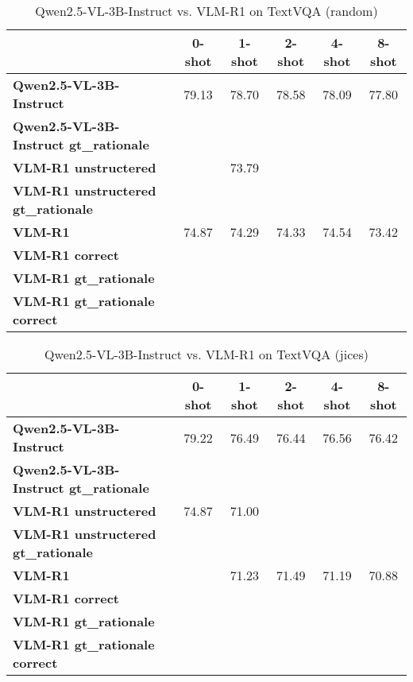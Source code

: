 \begin{table}
\caption{Qwen2.5-VL-3B-Instruct vs. VLM-R1 on TextVQA (random)}
\label{tab:Qwen2.5-VL-3B-Instruct_TextVQA_TRAIN_random}
\begin{tabular}{lccccc}
\toprule
 & 0-shot & 1-shot & 2-shot & 4-shot & 8-shot \\
\midrule
\textbf{Qwen2.5-VL-3B-Instruct} & 79.13 & 78.70 & 78.58 & 78.09 & 77.80 \\
\textbf{Qwen2.5-VL-3B-Instruct gt\_rationale} &  &  &  &  &  \\
\textbf{VLM-R1 unstructered} &  & 73.79 &  &  &  \\
\textbf{VLM-R1 unstructered gt\_rationale} &  &  &  &  &  \\
\textbf{VLM-R1} & 74.87 & 74.29 & 74.33 & 74.54 & 73.42 \\
\textbf{VLM-R1 correct} &  &  &  &  &  \\
\textbf{VLM-R1 gt\_rationale} &  &  &  &  &  \\
\textbf{VLM-R1 gt\_rationale correct} &  &  &  &  &  \\
\bottomrule
\end{tabular}
\end{table}


\begin{table}
\caption{Qwen2.5-VL-3B-Instruct vs. VLM-R1 on TextVQA (jices)}
\label{tab:Qwen2.5-VL-3B-Instruct_TextVQA_TRAIN_jices}
\begin{tabular}{lccccc}
\toprule
 & 0-shot & 1-shot & 2-shot & 4-shot & 8-shot \\
\midrule
\textbf{Qwen2.5-VL-3B-Instruct} & 79.22 & 76.49 & 76.44 & 76.56 & 76.42 \\
\textbf{Qwen2.5-VL-3B-Instruct gt\_rationale} &  &  &  &  &  \\
\textbf{VLM-R1 unstructered} & 74.87 & 71.00 &  &  &  \\
\textbf{VLM-R1 unstructered gt\_rationale} &  &  &  &  &  \\
\textbf{VLM-R1} &  & 71.23 & 71.49 & 71.19 & 70.88 \\
\textbf{VLM-R1 correct} &  &  &  &  &  \\
\textbf{VLM-R1 gt\_rationale} &  &  &  &  &  \\
\textbf{VLM-R1 gt\_rationale correct} &  &  &  &  &  \\
\bottomrule
\end{tabular}
\end{table}


